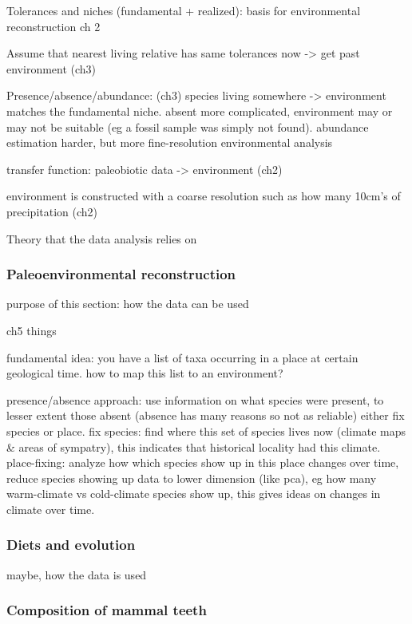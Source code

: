 \documentclass{article}
\begin{document}
Tolerances and niches (fundamental + realized): basis for environmental reconstruction \cite{Faith_Lyman_2019} ch 2

Assume that nearest living relative has same tolerances now -> get past environment (ch3)

Presence/absence/abundance: (ch3) species living somewhere -> environment matches the fundamental niche. absent more complicated,
environment may or may not be suitable (eg a fossil sample was simply not found). abundance estimation harder, but more
fine-resolution environmental analysis

transfer function: paleobiotic data -> environment (ch2)

environment is constructed with a coarse resolution such as how many 10cm's of precipitation (ch2)

Theory that the data analysis relies on

\subsubsection{Paleoenvironmental reconstruction}

purpose of this section: how the data can be used

ch5 things

fundamental idea: you have a list of taxa occurring in a place at certain geological time.
how to map this list to an environment?

presence/absence approach: use information on what species were present, to lesser extent those absent (absence has many reasons so not as reliable)
either fix species or place. fix species: find where this set of species lives now (climate maps \& areas of sympatry), this indicates 
that historical locality had this climate. place-fixing: analyze how which species show up in this place
 changes over time, reduce species showing up data to lower dimension
(like pca), eg how many warm-climate vs cold-climate species show up, this gives ideas on changes in climate over time.

\subsubsection{Diets and evolution}

maybe, how the data is used

\subsubsection{Composition of mammal teeth}
\end{document}
